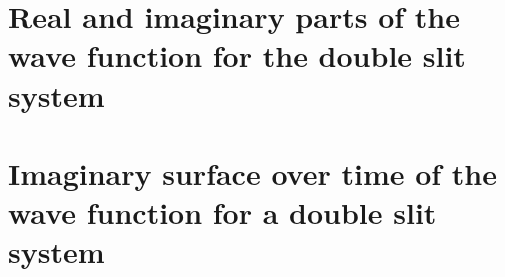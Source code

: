 \documentclass[10pt, reqno]{article}
\begin{document}


%  
  

  

\pagebreak




\pagebreak

\appendix
{}

\section{Real and imaginary parts of the wave function for the double slit system}
\label{appendix:real-imag}

\pagebreak

\section{Imaginary surface over time of the wave function for a double slit system}
\label{appendix:imaginary-surface}

\pagebreak 
\end{document}
